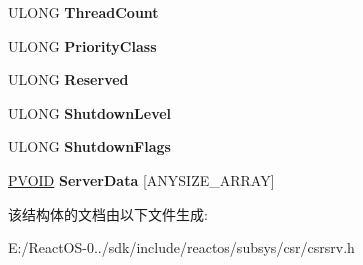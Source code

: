 \begin{DoxyCompactItemize}
\item 
\mbox{\label{struct___c_s_r___p_r_o_c_e_s_s_a1a6f21366ce33d40b8d2fe190488137e}} 
U\+L\+O\+NG {\bfseries Thread\+Count}
\item 
\mbox{\label{struct___c_s_r___p_r_o_c_e_s_s_aad777b59b0a63611216840db86b4b076}} 
U\+L\+O\+NG {\bfseries Priority\+Class}
\item 
\mbox{\label{struct___c_s_r___p_r_o_c_e_s_s_afac27d0f8cef71579d4f078d43d2181e}} 
U\+L\+O\+NG {\bfseries Reserved}
\item 
\mbox{\label{struct___c_s_r___p_r_o_c_e_s_s_a3d72cd5e366fe330f1857f0abf69d663}} 
U\+L\+O\+NG {\bfseries Shutdown\+Level}
\item 
\mbox{\label{struct___c_s_r___p_r_o_c_e_s_s_a2951831d871726e0a7142f4724073b4e}} 
U\+L\+O\+NG {\bfseries Shutdown\+Flags}
\item 
\mbox{\label{struct___c_s_r___p_r_o_c_e_s_s_aeba8106ced4b11f2cb11fe3d0a017bf5}} 
\hyperlink{interfacevoid}{P\+V\+O\+ID} {\bfseries Server\+Data} \mbox{[}A\+N\+Y\+S\+I\+Z\+E\+\_\+\+A\+R\+R\+AY\mbox{]}
\end{DoxyCompactItemize}


该结构体的文档由以下文件生成\+:\begin{DoxyCompactItemize}
\item 
E\+:/\+React\+O\+S-\/0../sdk/include/reactos/subsys/csr/csrsrv.\+h\end{DoxyCompactItemize}
